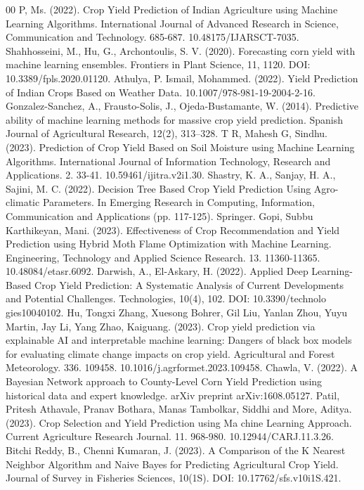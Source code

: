 \documentclass[conference]{IEEEtran}
\begin{document}
\begin{thebibliography}{00}
 P, Ms. (2022). Crop Yield Prediction of Indian Agriculture using Machine Learning Algorithms. International Journal of Advanced Research in Science, Communication and Technology. 685-687. 10.48175/IJARSCT-7035. 
 Shahhosseini, M., Hu, G., Archontoulis, S. V. (2020). Forecasting corn yield with machine learning ensembles. Frontiers in Plant Science, 11, 1120. DOI: 10.3389/fpls.2020.01120. 
 Athulya, P. Ismail, Mohammed. (2022). Yield Prediction of Indian Crops Based on Weather Data. 10.1007/978-981-19-2004-2-16. 
 Gonzalez-Sanchez, A., Frausto-Solis, J., Ojeda-Bustamante, W. (2014). Predictive ability of machine learning methods for massive crop yield prediction. Spanish Journal of Agricultural Research, 12(2), 313–328. 
 T R, Mahesh G, Sindhu. (2023). Prediction of Crop Yield Based on Soil Moisture using Machine Learning Algorithms. International Journal of Information Technology, Research and Applications. 2. 33-41. 10.59461/ijitra.v2i1.30. 
 Shastry, K. A., Sanjay, H. A., Sajini, M. C. (2022). Decision Tree Based Crop Yield Prediction Using Agro-climatic Parameters. In Emerging Research in Computing, Information, Communication and Applications (pp. 117-125). Springer. 
 Gopi, Subbu Karthikeyan, Mani. (2023). Effectiveness of Crop Recommendation and Yield Prediction using Hybrid Moth Flame Optimization with Machine Learning. Engineering, Technology and Applied Science Research. 13. 11360-11365. 10.48084/etasr.6092. 
 Darwish, A., El-Askary, H. (2022). Applied Deep Learning-Based Crop Yield Prediction: A Systematic Analysis of Current Developments and Potential Challenges. Technologies, 10(4), 102. DOI: 10.3390/technolo gies10040102. 
 Hu, Tongxi Zhang, Xuesong Bohrer, Gil Liu, Yanlan Zhou, Yuyu Martin, Jay Li, Yang Zhao, Kaiguang. (2023). Crop yield prediction via explainable AI and interpretable machine learning: Dangers of black box models for evaluating climate change impacts on crop yield. Agricultural and Forest Meteorology. 336. 109458. 10.1016/j.agrformet.2023.109458. 
 Chawla, V. (2022). A Bayesian Network approach to County-Level Corn Yield Prediction using historical data and expert knowledge. arXiv preprint arXiv:1608.05127. 
 Patil, Pritesh Athavale, Pranav Bothara, Manas Tambolkar, Siddhi and More, Aditya. (2023). Crop Selection and Yield Prediction using Ma chine Learning Approach. Current Agriculture Research Journal. 11. 968-980. 10.12944/CARJ.11.3.26. 
 Bitchi Reddy, B., Chenni Kumaran, J. (2023). A Comparison of the K Nearest Neighbor Algorithm and Naive Bayes for Predicting Agricultural Crop Yield. Journal of Survey in Fisheries Sciences, 10(1S). DOI: 10.17762/sfs.v10i1S.421.

\end{thebibliography}
\end{document}

